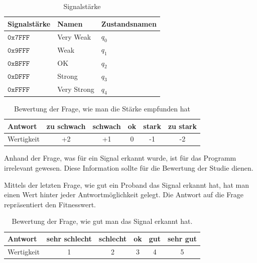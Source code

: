 \begin{table}[]
\centering
\caption{Signalst{\"a}rke}
\label{belegungzdiagramm}
\begin{tabular}{l|l|l}
  Signalst{\"a}rke  & Namen       & Zustandsnamen \\ \hline
  $\mathtt{0x7FFF}$ & Very Weak   & $q_{0}$       \\ \hline
  $\mathtt{0x9FFF}$ & Weak        & $q_{1}$       \\ \hline
  $\mathtt{0xBFFF}$ & OK          & $q_{2}$       \\ \hline
  $\mathtt{0xDFFF}$ & Strong      & $q_{3}$       \\ \hline
  $\mathtt{0xFFFF}$ & Very Strong & $q_{4}$       \\
\end{tabular}
\end{table}

\begin{table}[]
\centering
\caption{Bewertung der Frage, wie man die St{\"a}rke empfunden hat}
\label{bewertungzdiagrammfrage}
\begin{tabular}{l|l|l|l|l|l}
Antwort    & zu schwach              & schwach                 & ok                     & stark                   & zu stark               \\ \hline
Wertigkeit & \multicolumn{1}{c|}{+2} & \multicolumn{1}{c|}{+1} & \multicolumn{1}{c|}{0} & \multicolumn{1}{c|}{-1} & \multicolumn{1}{c}{-2}
\end{tabular}
\end{table}

Anhand der Frage, was f{\"u}r ein Signal erkannt wurde, ist f{\"u}r das Programm irrelevant gewesen. Diese Information sollte f{\"u}r die Bewertung der Studie dienen.

Mittels der letzten Frage, wie gut ein Proband das Signal erkannt hat, hat man einen Wert hinter jeder Antwortm{\"o}glichkeit gelegt. Die Antwort auf die Frage repr{\"a}sentiert den Fitnesswert. 

\begin{table}[]
\centering
\caption{Bewertung der Frage, wie gut man das Signal erkannt hat.}
\label{signalRating}
\begin{tabular}{l|l|l|l|l|l}
Antwort   & sehr schlecht          & schlecht               & ok                    & gut                   & sehr gut              \\ \hline
Wertigkeit & \multicolumn{1}{c|}{1} & \multicolumn{1}{c|}{2} & \multicolumn{1}{c|}{3} & \multicolumn{1}{c|}{4} & \multicolumn{1}{c}{5}
\end{tabular}
\end{table}

